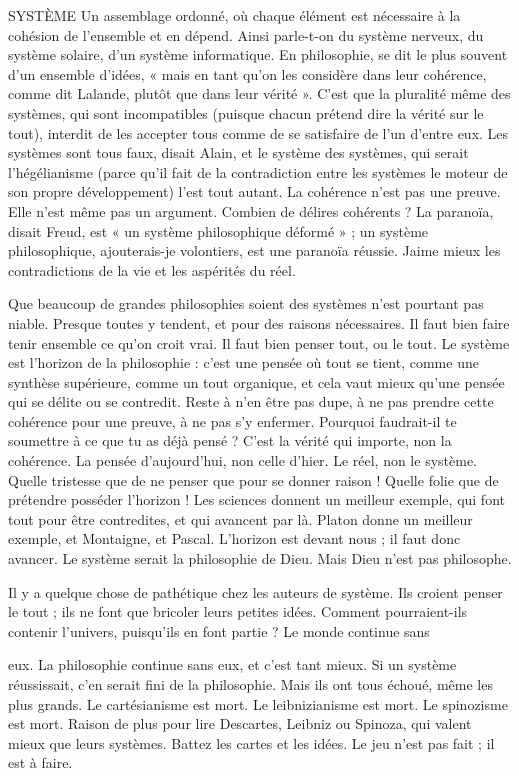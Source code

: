 SYSTÈME Un assemblage ordonné, où chaque élément est nécessaire à la
cohésion de l’ensemble et en dépend. Ainsi parle-t-on du système
nerveux, du système solaire, d’un système informatique. En philosophie, se
dit le plus souvent d’un ensemble d’idées, « mais en tant qu’on les considère
dans leur cohérence, comme dit Lalande, plutôt que dans leur vérité ». C’est
que la pluralité même des systèmes, qui sont incompatibles (puisque chacun
prétend dire la vérité sur le tout), interdit de les accepter tous comme de se
satisfaire de l’un d’entre eux. Les systèmes sont tous faux, disait Alain, et le système
des systèmes, qui serait l’hégélianisme (parce qu’il fait de la contradiction
entre les systèmes le moteur de son propre développement) l’est tout autant. La
cohérence n’est pas une preuve. Elle n’est même pas un argument. Combien de
délires cohérents ? La paranoïa, disait Freud, est « un système philosophique
déformé » ; un système philosophique, ajouterais-je volontiers, est une paranoïa
réussie. Jaime mieux les contradictions de la vie et les aspérités du réel.

Que beaucoup de grandes philosophies soient des systèmes n’est pourtant
pas niable. Presque toutes y tendent, et pour des raisons nécessaires. Il faut bien
faire tenir ensemble ce qu’on croit vrai. Il faut bien penser tout, ou le tout. Le
système est l'horizon de la philosophie : c’est une pensée où tout se tient,
comme une synthèse supérieure, comme un tout organique, et cela vaut mieux
qu'une pensée qui se délite ou se contredit. Reste à n’en être pas dupe, à ne pas
prendre cette cohérence pour une preuve, à ne pas s’y enfermer. Pourquoi faudrait-il
te soumettre à ce que tu as déjà pensé ? C’est la vérité qui importe, non
la cohérence. La pensée d’aujourd’hui, non celle d’hier. Le réel, non le système.
Quelle tristesse que de ne penser que pour se donner raison ! Quelle folie que
de prétendre posséder l’horizon ! Les sciences donnent un meilleur exemple,
qui font tout pour être contredites, et qui avancent par là. Platon donne un
meilleur exemple, et Montaigne, et Pascal. L’horizon est devant nous ; il faut
donc avancer. Le système serait la philosophie de Dieu. Mais Dieu n’est pas
philosophe.

Il y a quelque chose de pathétique chez les auteurs de système. Ils croient
penser le tout ; ils ne font que bricoler leurs petites idées. Comment pourraient-ils
contenir l’univers, puisqu'ils en font partie ? Le monde continue sans

eux. La philosophie continue sans eux, et c’est tant mieux. Si un système réussissait,
c’en serait fini de la philosophie. Mais ils ont tous échoué, même les plus
grands. Le cartésianisme est mort. Le leibnizianisme est mort. Le spinozisme est
mort. Raison de plus pour lire Descartes, Leibniz ou Spinoza, qui valent mieux
que leurs systèmes. Battez les cartes et les idées. Le jeu n’est pas fait ; il est à
faire.

